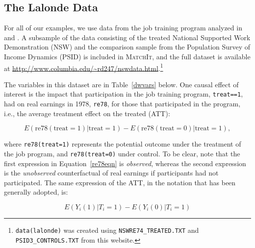 \documentclass[oneside,letterpaper,titlepage]{article}
\newcommand{\MatchIt}{\textsc{MatchIt}}
\begin{document}
\subsection{The Lalonde Data}
For all of our examples, we use data from the job training program
analyzed in \citet{lalonde86} and \citet{DehWah99}.  A subsample of
the data consisting of the treated National Supported Work
Demonstration (NSW) and the comparison sample from the Population
Survey of Income Dynamics (PSID) is included in \MatchIt, and the full
dataset is available at
\url{http://www.columbia.edu/~rd247/nswdata.html}.\footnote{\texttt{data(lalonde)}
  was created using \texttt{NSWRE74\_TREATED.TXT} and
  \texttt{PSID3\_CONTROLS.TXT} from this website.}

The variables in this dataset are in Table~\ref{dwvars} below.  One
causal effect of interest is the impact that participation in the job
training program, \texttt{treat==1}, had on real earnings in 1978,
\texttt{re78}, for those that participated in the program, i.e., the
average treatment effect on the treated (ATT):

\begin{equation}\label{re78eqn}
E(\text{re78}(\text{treat}=1) | \text{treat}=1) - E(\text{re78}(\text{treat}=0) | \text{treat}=1),
\end{equation}

\noindent where \texttt{re78(treat=1)} represents the potential
outcome under the treatment of the job program, and
\texttt{re78(treat=0)} under control.  To be clear, note that the
first expression in Equation~\ref{re78eqn} is \emph{observed}, whereas
the second expression is the \emph{unobserved} counterfactual of real
earnings if participants had not participated.  The same expression of
the ATT, in the notation that has been generally adopted, is:

\begin{equation}
E(Y_i(1) | T_i=1 ) - E(Y_i(0) | T_i=1)
\end{equation}
\end{document}
